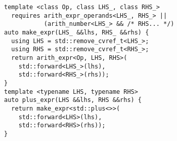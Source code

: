 \begin{lstlisting}[basicstyle=\small\ttfamily]
template <class Op, class LHS_, class RHS_>
  requires arith_expr_operands<LHS_, RHS_> ||
           (arith_number<LHS_> && /* RHS... */)
auto make_expr(LHS_ &&lhs, RHS_ &&rhs) {
  using LHS = std::remove_cvref_t<LHS_>;
  using RHS = std::remove_cvref_t<RHS_>;
  return arith_expr<Op, LHS, RHS>(
    std::forward<LHS_>(lhs),
    std::forward<RHS_>(rhs));
}
template <typename LHS, typename RHS>
auto plus_expr(LHS &&lhs, RHS &&rhs) {
  return make_expr<std::plus<>>(
    std::forward<LHS>(lhs),
    std::forward<RHS>(rhs));
}
\end{lstlisting}
